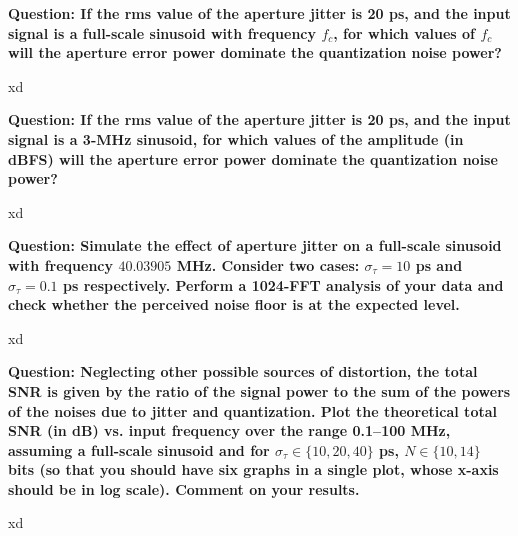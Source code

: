 \textbf{Question: If the rms value of the aperture jitter is 20 ps, and the input signal is a full-scale sinusoid with frequency $f_c$, for which values of $f_c$ will the aperture error power dominate the quantization noise power?
}
\vspace{0.5cm}

xd

\vspace{1cm}
\textbf{Question: If the rms value of the aperture jitter is 20 ps, and the input signal is a 3-MHz sinusoid, for which values of the amplitude (in dBFS) will the aperture error power dominate the quantization noise power?
}
\vspace{0.5cm}

xd

\vspace{1cm}
\textbf{Question: Simulate the effect of aperture jitter on a full-scale sinusoid with frequency $40.03905$ MHz.
Consider two cases: $\sigma_\tau = 10$ ps and $\sigma_\tau=0.1$ ps respectively. 
Perform a 1024-FFT analysis of your data and check whether the perceived noise floor is at the expected level.
}
\vspace{0.5cm}

xd

\vspace{1cm}
\textbf{Question: Neglecting other possible sources of distortion, the total SNR is given by the ratio of the signal power to the sum of the powers of the noises due to jitter and quantization. Plot the theoretical total SNR (in dB) vs. input frequency over the range 0.1--100 MHz, assuming a full-scale sinusoid and for $\sigma_\tau \in \{10,20,40\}$ ps, $N\in \{10, 14\}$ bits (so that you should have six graphs in a single plot, whose x-axis should be in log scale). Comment on your results.
}
\vspace{0.5cm}

xd
